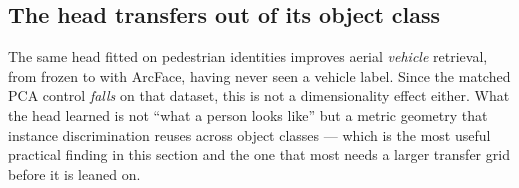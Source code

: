 \subsection{The head transfers out of its object class}
The same head fitted on \nHeadIdentities{} pedestrian identities improves aerial \emph{vehicle}
retrieval, from \leadVraiFrozen{} frozen to \leadVraiArc{} with ArcFace, having never seen a
vehicle label. Since the matched PCA control \emph{falls} on that dataset, this is not a
dimensionality effect either. What the head learned is not ``what a person looks like'' but a
metric geometry that instance discrimination reuses across object classes --- which is the
most useful practical finding in this section and the one that most needs a larger transfer
grid before it is leaned on.
